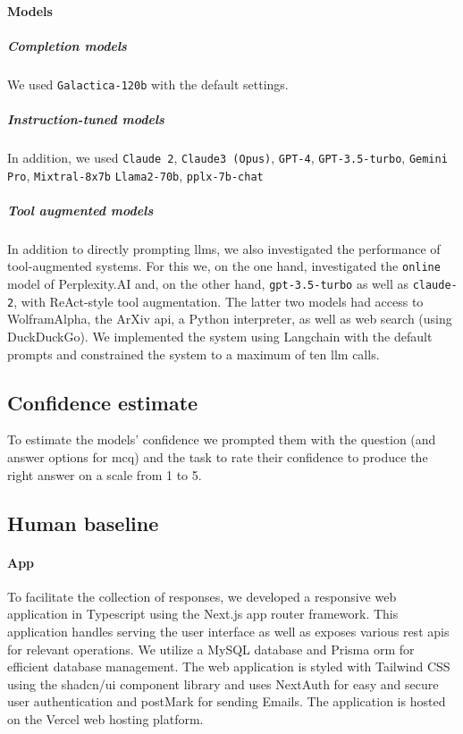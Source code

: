 \documentclass[11pt, oneside]{article}
\begin{document}
\paragraph{Models}
\subparagraph{Completion models}
We used \texttt{Galactica-120b}\cite{taylor2022galactica} with the default settings.


\subparagraph{Instruction-tuned models} In addition, we used \texttt{Claude 2}, \texttt{Claude3 (Opus)},\cite{anthropicClaudeModelFamily2024} \texttt{GPT-4},\cite{openai2024gpt4} \texttt{GPT-3.5-turbo},\cite{brown2020language}
\texttt{Gemini Pro},\cite{gemini}
\texttt{Mixtral-8x7b}\cite{jiang2024mixtral}
\texttt{Llama2-70b},\cite{touvron2023llama}
\texttt{pplx-7b-chat}

\subparagraph{Tool augmented models}
In addition to directly prompting \glspl{llm}, we also investigated the performance of tool-augmented systems.
For this we, on the one hand, investigated the \texttt{online} model of Perplexity.AI and, on the other hand, \texttt{gpt-3.5-turbo} as well as \texttt{claude-2}, with ReAct-style tool augmentation.\cite{yao2023react}
The latter two models had access to WolframAlpha, the ArXiv \gls{api}, a Python interpreter, as well as web search (using DuckDuckGo).
We implemented the system using Langchain with the default prompts and constrained the system to a maximum of ten \gls{llm} calls.


\subsection{Confidence estimate}
To estimate the models' confidence we prompted them with the question (and answer options for \gls{mcq}) and the task to rate their confidence to produce the right answer on a scale from 1 to 5. 

\subsection{Human baseline}

\paragraph{App} To facilitate the collection of responses, we developed a responsive web application in Typescript using the Next.js\cite{nextjs} app router framework.
This application handles serving the user interface as well as exposes various \gls{rest} \glspl{api} for relevant operations.
We utilize a MySQL\cite{mysql} database and Prisma \gls{orm}\cite{prisma} for efficient database management.
The web application is styled with Tailwind CSS\cite{tailwindcss} using the shadcn/ui component library and uses NextAuth\cite{nextauth} for easy and secure user authentication and postMark for sending Emails.
The application is hosted on the Vercel web hosting platform.
\end{document}
